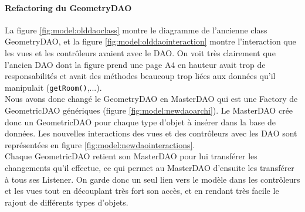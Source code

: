 		\paragraph{Refactoring du GeometryDAO}
		La figure \ref{fig:model:olddaoclass} montre le diagramme de l'ancienne
		class GeometryDAO, et la figure \ref{fig:model:olddaointeraction} montre
		l'interaction que les vues et les contrôleurs avaient avec le DAO. On
		voit très clairement que l'ancien DAO dont la figure prend une page A4
		en hauteur avait trop de responsabilités et avait des méthodes beaucoup
		trop liées aux données qu'il manipulait (\texttt{getRoom()},...).\\

		Nous avons donc changé le GeometryDAO en MasterDAO qui est une Factory de 
		GeometricDAO génériques (figure \ref{fig:model:newdaoarchi}). Le MasterDAO 
		crée donc un GeometricDAO pour chaque type d'objet à insérer dans 
		la base de données. Les nouvelles interactions des vues et des contrôleurs 
		avec les DAO sont représentées en figure \ref{fig:model:newdaointeractions}.\\

		Chaque GeometricDAO retient son MasterDAO pour lui transférer les changements
		qu'il effectue, ce qui permet au MasterDAO d'ensuite les transférer à tous 
		ses Listener. On garde donc un seul lien vers le modèle
		dans les contrôleurs et les vues tout en découplant très fort son accès,
		et en rendant très facile le rajout de différents types d'objets.\\

